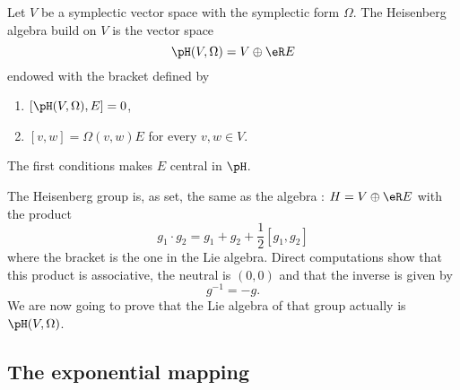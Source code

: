 Let $V$ be a symplectic vector space with the symplectic form $\Omega$. The \hypertarget{HyperHeisenberg}{Heisenberg algebra} build on $V$ is the vector space
\begin{equation}
	\pH(V,\Omega)=V\oplus \eR E
\end{equation}
endowed with the bracket defined by
\begin{enumerate}

	\item
		$[\pH(V,\Omega),E]=0$,
	\item
		$[v,w]=\Omega(v,w)E$ for every $v,w\in V$.

\end{enumerate}
The first conditions makes $E$ central in $\pH$.

The Heisenberg group is, as set, the same as the algebra : $H=V\oplus\eR E$ with the product
\begin{equation}		\label{EqProduitHeisenbergGp}
	g_1\cdot g_2=g_1+g_2+\frac{ 1 }{2}[g_1,g_2]
\end{equation}
where the bracket is the one in the Lie algebra. Direct computations show that this product is associative, the neutral is $(0,0)$ and that the inverse is given by
\begin{equation}
	g^{-1}=-g.
\end{equation}
We are now going to prove that the Lie algebra of that group actually is $\pH(V,\Omega)$.

\subsection{The exponential mapping}

